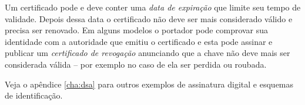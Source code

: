 Um certificado pode e deve conter uma {\em data de expiração} que limite seu tempo de validade.
Depois dessa data o certificado não deve ser mais considerado válido e precisa ser renovado.
Em alguns modelos o portador pode comprovar sua identidade com a autoridade que emitiu o certificado e esta pode assinar e publicar um {\em certificado de revogação} anunciando que a chave não deve mais ser considerada válida -- por exemplo no caso de ela ser perdida ou roubada.

Veja o apêndice \ref{cha:dsa} para outros exemplos de assinatura digital e esquemas de identificação.





